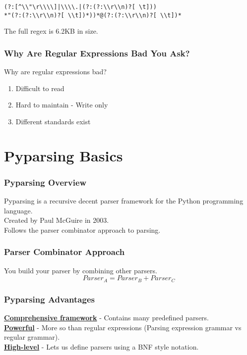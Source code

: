 \documentclass{beamer}
\begin{document}
\begin{frame}[fragile]
\begin{verbatim}
(?:[^\\"\r\\\\]|\\\\.|(?:(?:\\r\\n)?[ \t]))
*"(?:(?:\\r\\n)?[ \\t])*))*@(?:(?:\\r\\n)?[ \\t])*
\end{verbatim}
The full regex is 6.2KB in size.

\end{frame}


\begin{frame}[fragile]
\frametitle{Why Are Regular Expressions Bad You Ask?}
Why are regular expressions bad?

\begin{enumerate}
\pause
\item Difficult to read
\pause
\item Hard to maintain - Write only
\pause
\item Different standards exist
\end{enumerate}

\end{frame}

\section{Pyparsing Basics}

\begin{frame}
\frametitle{Pyparsing Overview}
Pyparsing is a recursive decent parser framework for the Python programming language. \\
\medskip
Created by Paul McGuire in 2003. \\
\medskip
Follows the parser combinator approach to parsing.
\end{frame}

\begin{frame}
\frametitle{Parser Combinator Approach}
You build your parser by combining other parsers.
$$Parser_A = Parser_B + Parser_C$$
\end{frame}

\begin{frame}
\frametitle{Pyparsing Advantages}

\textbf{\underline{Comprehensive framework}} - Contains many predefined parsers. \\
\medskip
\textbf{\underline{Powerful}} - More so than regular expressions (Parsing expression grammar vs regular grammar).\\
\bigskip
\textbf{\underline{High-level}} - Lets us define parsers using a BNF style notation.
\end{frame}
\end{document}
